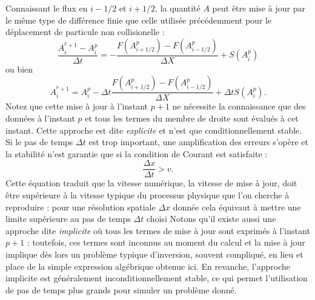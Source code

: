  Connaissant le flux en $i-1/2$ et $i+1/2$, la quantité $A$ peut être mise à jour par le même type de différence finie que celle utilisée précédemment pour le déplacement de particule non collisionelle :
 \begin{equation}
 \frac{A_i^{^p+1}-A_i^p}{\Delta t}=-\frac{F(A_{i+1/2}^p)-F(A_{i-1/2}^p)}{\Delta X}+S(A_i^p)
 \end{equation}
 ou bien
 \begin{equation}
 A_i^{^p+1}=A_i^p-\Delta t \frac{F(A_{i+1/2}^p)-F(A_{i-1/2}^p)}{\Delta X}+\Delta t S(A_i^p).
 \end{equation}
Notez que cette mise à jour à l'instant $p+1$ ne nécessite la connaissance que des données à l'instant $p$ et tous les termes du membre de droite sont évalués à cet instant. Cette approche est dite \textit{explicite} et n'est que conditionnellement stable. Si le pas de temps $\Delta t$ est trop important, une amplification des erreurs s'opère et la stabilité n'est garantie que si la condition de Courant est satisfaite :
\begin{equation}
\frac{\Delta x}{ \Delta t}> v.
\end{equation}
Cette équation traduit que la vitesse numérique, la vitesse de mise à jour, doit être supérieure à la vitesse typique du processus physique que l'on cherche à reproduire : pour une résolution spatiale $\Delta x$ donnée cela équivaut à mettre une limite supérieure au pas de temps $\Delta t$ choisi  Notons qu'il existe aussi une approche dite \textit{implicite} où tous les termes de mise à jour sont exprimés à l'instant $p+1$ : toutefois, ces termes sont inconnus au moment du calcul et la mise à jour implique dès lors un problème typique d'inversion, souvent compliqué, en lieu et place de la simple expression algébrique obtenue ici. En revanche, l'approche implicite est généralement inconditionnellement stable, ce qui permet l'utilisation de pas de temps plus grands pour simuler un problème donné.

